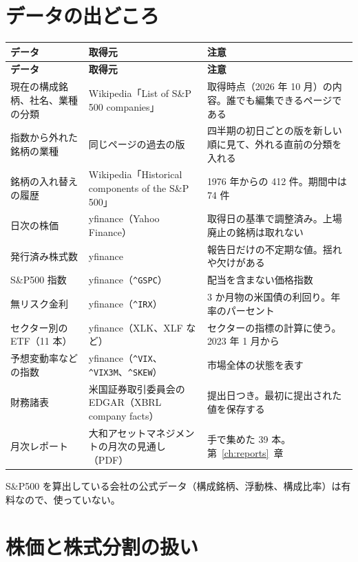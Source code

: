 \documentclass[xelatex,ja=standard,jafont=hiragino-pron,a4paper,10pt]{bxjsreport}
\newcommand{\SP}{S\&P500}
\newcommand{\code}[1]{\texttt{#1}}
\newcommand{\chapref}[1]{第~\ref{#1}~章}
\begin{document}
\section{データの出どころ}

\begin{longtable}{p{3.60cm}p{4.60cm}p{6.20cm}}
\toprule
\textbf{データ} & \textbf{取得元} & \textbf{注意} \\
\midrule
\endfirsthead
\toprule
\textbf{データ} & \textbf{取得元} & \textbf{注意} \\
\midrule
\endhead
\bottomrule
\endfoot
現在の構成銘柄、社名、業種の分類 & Wikipedia「List of S\&P 500 companies」 & 取得時点（2026 年 10 月）の内容。誰でも編集できるページである \\
指数から外れた銘柄の業種 & 同じページの過去の版 & 四半期の初日ごとの版を新しい順に見て、外れる直前の分類を入れる \\
銘柄の入れ替えの履歴 & Wikipedia「Historical components of the S\&P 500」 & 1976 年からの 412 件。期間中は 74 件 \\
日次の株価 & yfinance（Yahoo Finance） & 取得日の基準で調整済み。上場廃止の銘柄は取れない \\
発行済み株式数 & yfinance & 報告日だけの不定期な値。揺れや欠けがある \\
\SP{} 指数 & yfinance（\code{\textasciicircum GSPC}） & 配当を含まない価格指数 \\
無リスク金利 & yfinance（\code{\textasciicircum IRX}） & 3 か月物の米国債の利回り。年率のパーセント \\
セクター別の ETF（11 本） & yfinance（XLK、XLF など） & セクターの指標の計算に使う。2023 年 1 月から \\
予想変動率などの指数 & yfinance（\code{\textasciicircum VIX}、\code{\textasciicircum VIX3M}、\code{\textasciicircum SKEW}） & 市場全体の状態を表す \\
財務諸表 & 米国証券取引委員会の EDGAR（XBRL company facts） & 提出日つき。最初に提出された値を保存する \\
月次レポート & 大和アセットマネジメントの月次の見通し（PDF） & 手で集めた 39 本。\chapref{ch:reports} \\
\end{longtable}

\SP{} を算出している会社の公式データ（構成銘柄、浮動株、構成比率）は有料なので、使っていない。

\section{株価と株式分割の扱い}
\end{document}
